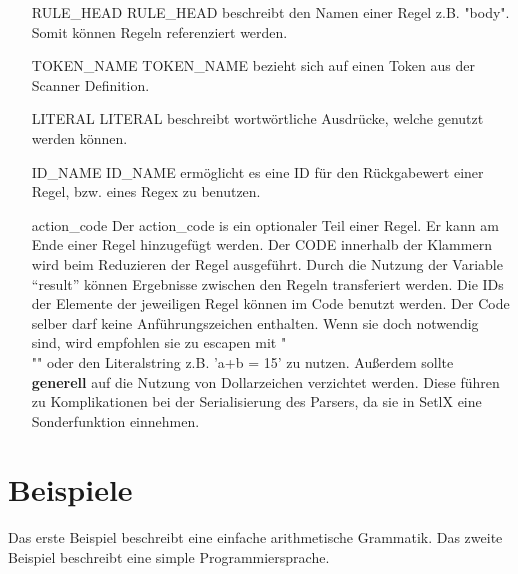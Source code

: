 \begin{itemize}
	\item[RULE\_HEAD]  RULE\_HEAD beschreibt den Namen einer Regel z.B. "body". Somit können Regeln referenziert werden. 
	\item[TOKEN\_NAME] TOKEN\_NAME bezieht sich auf einen Token aus der Scanner Definition.
	\item[LITERAL] LITERAL beschreibt wortwörtliche Ausdrücke, welche genutzt werden können. 
	\item[ID\_NAME] ID\_NAME ermöglicht es eine ID für den Rückgabewert einer Regel, bzw. eines Regex zu benutzen.
	\item[action\_code] Der action\_code is ein optionaler Teil einer Regel. Er kann am Ende einer Regel hinzugefügt werden. Der CODE innerhalb der Klammern  wird beim Reduzieren der Regel ausgeführt. Durch die Nutzung der Variable "`result"' können Ergebnisse zwischen den Regeln transferiert werden. Die IDs der Elemente der jeweiligen Regel können im Code benutzt werden. Der Code selber darf keine Anführungszeichen enthalten. Wenn sie doch notwendig sind, wird empfohlen sie zu escapen mit "\\"" oder den Literalstring z.B. 'a+b = 15' zu nutzen. Außerdem sollte \textbf{generell} auf die Nutzung von Dollarzeichen verzichtet werden. Diese führen zu Komplikationen bei der Serialisierung des Parsers, da sie in SetlX eine Sonderfunktion einnehmen. 
\end{itemize}
\newpage
\section{Beispiele}
Das erste Beispiel beschreibt eine einfache arithmetische Grammatik.
Das zweite Beispiel beschreibt eine simple Programmiersprache.
